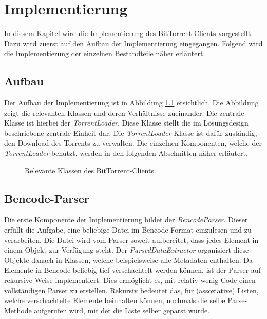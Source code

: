 \chapter{Implementierung}
\label{cha:Implementierung}

In diesem Kapitel wird die Implementierung des BitTorrent-Clients vorgestellt. Dazu wird zuerst auf den Aufbau der Implementierung eingegangen. Folgend wird die Implementierung der einzelnen Bestandteile näher erläutert. 

\section{Aufbau}

Der Aufbau der Implementierung ist in Abbildung \ref{fig:KlassenClient} ersichtlich. Die Abbildung zeigt die relevanten Klassen und deren Verhältnisse zueinander. Die zentrale Klasse ist hierbei der \emph{TorrentLoader}. Diese Klasse stellt die im Lösungsdesign beschriebene zentrale Einheit dar. Die \emph{TorrentLoader}-Klasse ist dafür zuständig, den Download des Torrents zu verwalten. Die einzelnen Komponenten, welche der \emph{TorrentLoader} benutzt, werden in den folgenden Abschnitten näher erläutert.  

\begin{figure}[]
    \centering
    \caption{Relevante Klassen des BitTorrent-Clients.}
    \label{fig:KlassenClient}
\end{figure}

\section{Bencode-Parser}

Die erste Komponente der Implementierung bildet der \emph{BencodeParser}. Dieser erfüllt die Aufgabe, eine beliebige Datei im Bencode-Format einzulesen und zu verarbeiten. Die Datei wird vom Parser soweit aufbereitet, dass jedes Element in einem Objekt zur Verfügung steht. Der \emph{ParsedDataExtractor} organisiert diese Objekte danach in Klassen, welche beispielsweise alle Metadaten enthalten. Da Elemente in Bencode beliebig tief verschachtelt werden können, ist der Parser auf rekursive Weise implementiert. Dies ermöglicht es, mit relativ wenig Code einen vollständigen Parser zu erstellen. Rekursiv bedeutet das, für (assoziative) Listen, welche verschachtelte Elemente beinhalten können, nochmals die selbe Parse-Methode aufgerufen wird, mit der die Liste selber geparst wurde.

